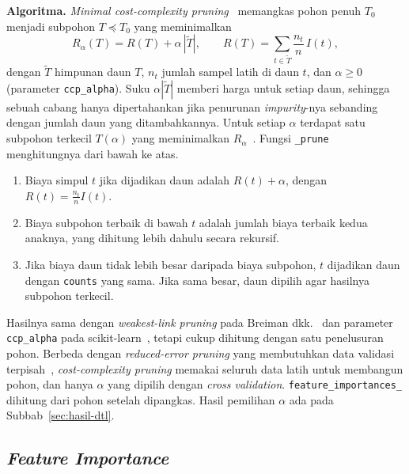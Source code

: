 \textbf{Algoritma.} \textit{Minimal cost-complexity pruning}~\cite{breiman1984cart}
memangkas pohon penuh $T_0$ menjadi subpohon $T\preceq T_0$ yang meminimalkan
\begin{equation}
	R_\alpha(T)=R(T)+\alpha\,|\widetilde{T}|,\qquad R(T)=\sum_{t\in\widetilde{T}}\frac{n_t}{n}\,I(t),
\end{equation}
dengan $\widetilde{T}$ himpunan daun $T$, $n_t$ jumlah sampel latih di daun $t$,
dan $\alpha\ge0$ (parameter \texttt{ccp\_alpha}). Suku $\alpha|\widetilde{T}|$
memberi harga untuk setiap daun, sehingga sebuah cabang hanya dipertahankan jika
penurunan \textit{impurity}-nya sebanding dengan jumlah daun yang ditambahkannya.
Untuk setiap $\alpha$ terdapat satu subpohon terkecil $T(\alpha)$ yang meminimalkan
$R_\alpha$~\cite{breiman1984cart}. Fungsi \texttt{\_prune} menghitungnya dari bawah
ke atas.
\begin{enumerate}
	\item Biaya simpul $t$ jika dijadikan daun adalah $R(t)+\alpha$, dengan
	$R(t)=\frac{n_t}{n}I(t)$.
	\item Biaya subpohon terbaik di bawah $t$ adalah jumlah biaya terbaik kedua
	anaknya, yang dihitung lebih dahulu secara rekursif.
	\item Jika biaya daun tidak lebih besar daripada biaya subpohon, $t$ dijadikan
	daun dengan \texttt{counts} yang sama. Jika sama besar, daun dipilih agar
	hasilnya subpohon terkecil.
\end{enumerate}
Hasilnya sama dengan \textit{weakest-link pruning} pada Breiman dkk.~\cite{breiman1984cart}
dan parameter \texttt{ccp\_alpha} pada scikit-learn~\cite{sklearn2026tree}, tetapi
cukup dihitung dengan satu penelusuran pohon. Berbeda dengan
\textit{reduced-error pruning} yang membutuhkan data validasi
terpisah~\cite{kkif2021dtloverfit}, \textit{cost-complexity pruning} memakai
seluruh data latih untuk membangun pohon, dan hanya $\alpha$ yang dipilih dengan
\textit{cross validation}. \texttt{feature\_importances\_} dihitung dari pohon
setelah dipangkas. Hasil pemilihan $\alpha$ ada pada Subbab~\ref{sec:hasil-dtl}.



\subsection{\textit{Feature Importance}}


